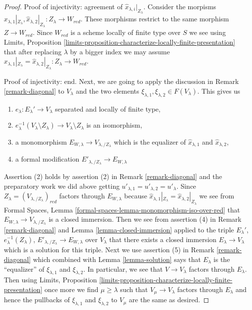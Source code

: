 \documentclass[10pt,a4paper]{amsart}
\theoremstyle{plain}
\theoremstyle{definition}
\theoremstyle{remark}
\numberwithin{equation}{subsection}
\begin{document}
\begin{proof}
\medskip\noindent
Proof of injectivity: agreement of $\hat x_{\lambda, i}|_{Z_\lambda}$.
Consider the morpisms
$\hat x_{\lambda, 1}|_{Z_\lambda}, \hat x_{\lambda, 2}|_{Z_\lambda} :
Z_\lambda \to W_{red}$.
These morphisms restrict to the same morphism $Z \to W_{red}$.
Since $W_{red}$ is a scheme locally of finite type over $S$
we see using Limits, Proposition
\ref{limits-proposition-characterize-locally-finite-presentation}
that after replacing $\lambda$ by a bigger index
we may assume
$\hat x_{\lambda, 1}|_{Z_\lambda} = \hat x_{\lambda, 2}|_{Z_\lambda} :
Z_\lambda \to W_{red}$.

\medskip\noindent
Proof of injectivity: end.
Next, we are going to apply the discussion in
Remark \ref{remark-diagonal} to $V_\lambda$ and the two elements
$\xi_{\lambda, 1}, \xi_{\lambda, 2} \in F(V_\lambda)$.
This gives us
\begin{enumerate}
\item $e_\lambda : E_\lambda' \to V_\lambda$
separated and locally of finite type,
\item $e_\lambda^{-1}(V_\lambda \setminus Z_\lambda) \to
V_\lambda \setminus Z_\lambda$ is an isomorphism,
\item a monomorphism $E_{W, \lambda} \to V_{\lambda, /Z_\lambda}$
which is the equalizer of $\hat x_{\lambda, 1}$ and $\hat x_{\lambda, 2}$,
\item a formal modification $E'_{\lambda, /Z_\lambda} \to E_{W, \lambda}$
\end{enumerate}
Assertion (2) holds by assertion (2) in Remark \ref{remark-diagonal}
and the preparatory work we did above getting
$u'_{\lambda, 1} = u'_{\lambda, 2} = u'_\lambda$.
Since $Z_\lambda = (V_{\lambda, /Z_\lambda})_{red}$ factors through
$E_{W, \lambda}$ because
$\hat x_{\lambda, 1}|_{Z_\lambda} = \hat x_{\lambda, 2}|_{Z_\lambda}$
we see from
Formal Spaces, Lemma \ref{formal-spaces-lemma-monomorphism-iso-over-red}
that $E_{W, \lambda} \to V_{\lambda, /Z_\lambda}$ is a closed immersion.
Then we see from assertion (4) in Remark \ref{remark-diagonal}
and Lemma \ref{lemma-closed-immersion} applied to the triple
$E_\lambda'$, $e_\lambda^{-1}(Z_\lambda)$,
$E'_{\lambda, /Z_\lambda} \to E_{W, \lambda}$ over $V_\lambda$ that
there exists a closed immersion $E_\lambda \to V_\lambda$
which is a solution for this triple.
Next we use assertion (5) in Remark \ref{remark-diagonal}
which combined with Lemma \ref{lemma-solution}
says that $E_\lambda$ is the ``equalizer'' of $\xi_{\lambda, 1}$
and $\xi_{\lambda, 2}$. In particular, we see that $V \to V_\lambda$
factors through $E_\lambda$. Then using Limits, Proposition
\ref{limits-proposition-characterize-locally-finite-presentation}
once more we find $\mu \geq \lambda$ such that $V_\mu \to V_\lambda$
factors through $E_\lambda$ and hence the pullbacks of
$\xi_{\lambda, 1}$ and $\xi_{\lambda, 2}$ to $V_\mu$ are the same
as desired.


\end{proof}
\end{document}
